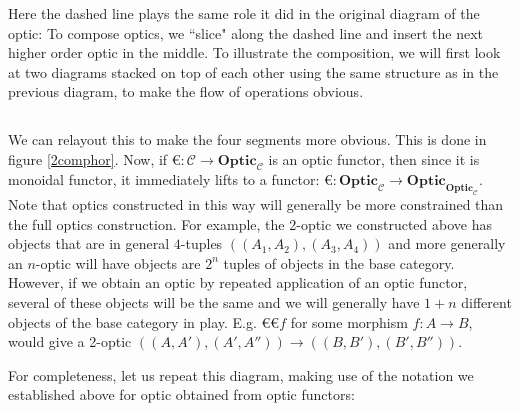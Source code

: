 \documentclass[letterpaper, 10 pt, conference]{ieeeconf}  %
\newcommand{\Optic}{\textbf{Optic}}
\begin{document}
Here the dashed line plays the same role it did in the original diagram of
the optic: To compose optics, we ``slice" along the dashed line and insert
the next higher order optic in the middle. To illustrate the composition,
we will first look at two diagrams stacked on top of each other using the
same structure as in the previous diagram, to make the flow of operations
obvious.

\begin{equation}

\end{equation}

We can relayout this to make the four segments more obvious. This is done in
figure \ref{2comphor}. Now, if $\euro{}: \mathcal{C} \to \Optic_\mathcal{C}$ is an
optic functor, then since it is monoidal functor, it immediately lifts to a functor:
$\euro: \Optic_{\mathcal{C}} \to \Optic_{\Optic_\mathcal{C}}$. Note that optics
constructed in this way will generally be more constrained than the full optics
construction. For example, the 2-optic we constructed above has objects that
are in general $4$-tuples $((A_1, A_2), (A_3, A_4))$ and more generally an $n$-optic
will have objects are $2^n$ tuples of objects in the base category. However,
if we obtain an optic by repeated application of an optic functor, several
of these objects will be the same and we will generally have $1+n$ different
objects of the base category in play. E.g. $\euro \euro f$ for some
morphism $f: A\to B$, would give a 2-optic $((A, A'),(A', A'')) \to ((B,B'),(B',B''))$.

For completeness, let us repeat this diagram, making use of the notation we established
above for optic obtained from optic functors:
\end{document}
